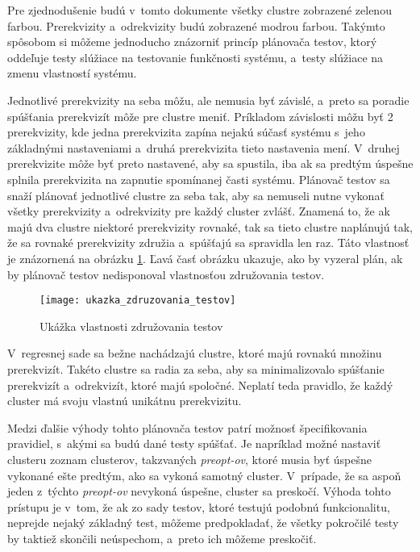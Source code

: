 Pre zjednodušenie budú v~tomto dokumente všetky clustre zobrazené 
zelenou farbou.
Prerekvizity a~odrekvizity budú zobrazené modrou farbou. Takýmto spôsobom
si môžeme jednoducho znázorniť princíp plánovača testov, ktorý oddeľuje testy
slúžiace na testovanie funkčnosti systému, a~testy slúžiace na zmenu 
vlastností systému.

Jednotlivé prerekvizity na seba môžu, ale nemusia byť závislé, a~preto 
sa poradie spúšťania prerekvizít môže pre clustre meniť.
Príkladom závislosti môžu byť 2 prerekvizity, kde jedna prerekvizita 
zapína nejakú súčasť systému s~jeho základnými nastaveniami 
a~druhá prerekvizita tieto nastavenia mení. 
V~druhej prerekvizite môže byť preto nastavené, aby sa spustila, iba ak 
sa predtým úspešne splnila prerekvizita na zapnutie spomínanej časti 
systému. Plánovač testov sa snaží plánovať jednotlivé clustre za seba 
tak, aby sa nemuseli nutne vykonať všetky prerekvizity a~odrekvizity pre 
každý cluster zvlášť. Znamená to, že ak majú dva clustre niektoré 
prerekvizity rovnaké, tak sa tieto clustre naplánujú tak, že sa rovnaké 
prerekvizity združia a~spúšťajú sa spravidla len raz. 
Táto vlastnosť je znázornená na obrázku 
\ref{obrazok:ukazka_zdruzovania_testov}. 
Ľavá časť obrázku ukazuje, ako by vyzeral plán, ak by plánovač testov
nedisponoval vlastnosťou združovania testov.

\begin{figure}[h]
  \begin{center}
    \texttt{[image: ukazka\_zdruzovania\_testov]}
    \caption{Ukážka vlastnosti združovania testov}
    \label{obrazok:ukazka_zdruzovania_testov}
  \end{center}
\end{figure}

V~regresnej sade sa bežne nachádzajú clustre, ktoré majú rovnakú množinu 
prerekvizít. Takéto clustre sa radia za seba, aby sa minimalizovalo
spúšťanie prerekvizít a~odrekvizít, ktoré majú spoločné. Neplatí teda 
pravidlo, že každý cluster má svoju vlastnú unikátnu prerekvizitu.

Medzi ďalšie výhody tohto plánovača testov patrí možnosť špecifikovania 
pravidiel, s~akými sa budú dané testy spúšťať. Je napríklad možné 
nastaviť clusteru zoznam clusterov, takzvaných \textit{preopt-ov}, ktoré musia byť 
úspešne vykonané ešte predtým, ako sa vykoná samotný cluster. V~prípade, 
že sa aspoň jeden z~týchto \textit{preopt-ov} nevykoná úspešne, cluster sa preskočí.
Výhoda tohto prístupu je v~tom, že ak zo sady testov, ktoré testujú 
podobnú funkcionalitu, neprejde nejaký základný test, môžeme predpokladať, 
že všetky pokročilé testy by taktiež skončili neúspechom, 
a~preto ich môžeme preskočiť.

